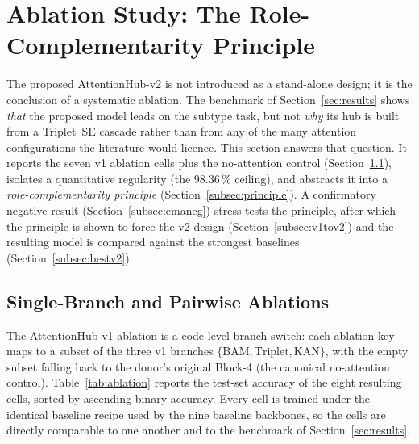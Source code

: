 \section{Ablation Study: The Role-Complementarity
Principle}\label{sec:ablation}

The proposed AttentionHub-v2 is not introduced as a stand-alone design; it is
the conclusion of a systematic ablation. The benchmark of
Section~\ref{sec:results} shows \emph{that} the proposed model leads on the
subtype task, but not \emph{why} its hub is built from a Triplet~\arrowto{}SE
cascade rather than from any of the many attention configurations the
literature would licence. This section answers that question. It reports the
seven v1 ablation cells plus the no-attention control
(Section~\ref{subsec:ablcells}), isolates a quantitative regularity (the
$98.36\,\%$ ceiling), and abstracts it into a \emph{role-complementarity
principle} (Section~\ref{subsec:principle}). A confirmatory negative result
(Section~\ref{subsec:emaneg}) stress-tests the principle, after which the
principle is shown to force the v2 design (Section~\ref{subsec:v1tov2}) and the
resulting model is compared against the strongest baselines
(Section~\ref{subsec:bestv2}).

\subsection{Single-Branch and Pairwise Ablations}\label{subsec:ablcells}

The AttentionHub-v1 ablation is a code-level branch switch: each ablation key
maps to a subset of the three v1 branches $\{\text{BAM}, \text{Triplet},
\text{KAN}\}$, with the empty subset falling back to the donor's original
Block-4 (the canonical no-attention control). Table~\ref{tab:ablation} reports
the test-set accuracy of the eight resulting cells, sorted by ascending binary
accuracy. Every cell is trained under the identical baseline recipe used by the
nine baseline backbones, so the cells are directly comparable to one another
and to the benchmark of Section~\ref{sec:results}.

